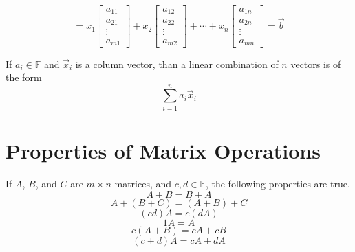$$=x_1\begin{bmatrix}
	a_{11}\\a_{21}\\\vdots\\a_{m1}
\end{bmatrix}+x_2\begin{bmatrix}
a_{12}\\a_{22}\\\vdots\\a_{m2}
\end{bmatrix}+\cdots+x_n\begin{bmatrix}
a_{1n}\\a_{2n}\\\vdots\\a_{mn}
\end{bmatrix}=\vec{b}$$
\begin{definition}\label{def:5}
	If $a_i\in\mathbb{F}$ and $\vec{x}_i$ is a column vector, than a linear combination of $n$ vectors is of the form
	$$\sum_{i=1}^n a_i\vec{x}_i$$
\end{definition}
\section{Properties of Matrix Operations}
\begin{theorem}\label{thm:1}
	If $A$, $B$, and $C$ are $m\times n$ matrices,  and $c,d\in\mathbb{F}$, the following properties are true.
	$$A+B=B+A$$
	$$A+(B+C)=(A+B)+C$$
	$$(cd)A=c(dA)$$
	$$1A=A$$
	$$c(A+B)=cA+cB$$
	$$(c+d)A=cA+dA$$
\end{theorem}